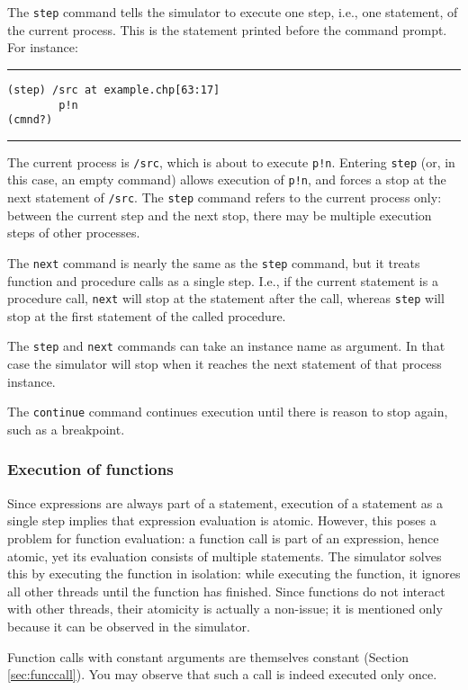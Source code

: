 The \verb|step| command tells the simulator to execute one step, i.e., one
statement, of the current process. This is the statement printed before
the command prompt. For instance:
\medskip
\hrule
\begin{verbatim}
(step) /src at example.chp[63:17]
        p!n
(cmnd?) 
\end{verbatim}
\hrule
\medskip
The current process is \verb|/src|, which is about to execute \verb|p!n|. Entering
\verb|step| (or, in this case, an empty command) allows execution of \verb|p!n|,
and forces a stop at the next statement of \verb|/src|. The \verb|step| command
refers to the current process only: between the current step and the
next stop, there may be multiple execution steps of other processes.

The \verb|next| command is nearly the same as the \verb|step| command, but it
treats function and procedure calls as a single step. I.e., if the
current statement is a procedure call, \verb|next| will stop at the statement
after the call, whereas \verb|step| will stop at the first statement of
the called procedure.

The \verb|step| and \verb|next| commands can take an instance name as argument.
In that case the simulator will stop when it reaches the next statement
of that process instance.

The \verb|continue| command continues execution until there is reason to
stop again, such as a breakpoint.


\subsubsection{Execution of functions}\label{sec:functionexec}

Since expressions are always part of a statement, execution of a
statement as a single step implies that expression evaluation is atomic.
However, this poses a problem for function evaluation: a function call
is part of an expression, hence atomic, yet its evaluation consists
of multiple statements. The simulator solves this by executing the
function in isolation: while executing the function, it ignores all other
threads until the function has finished. Since functions do not interact
with other threads, their atomicity is actually a non-issue; it
is mentioned only because it can be observed in the simulator.

Function calls with constant arguments are themselves constant (Section
\ref{sec:funccall}). You may observe that such a call is indeed executed
only once.

